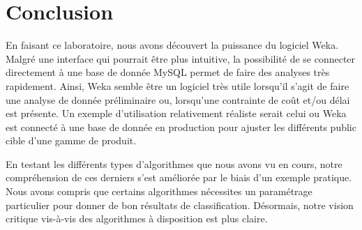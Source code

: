 \chapter{Conclusion}

En faisant ce laboratoire, nous avons découvert la puissance du logiciel Weka. Malgré une interface qui pourrait être plus intuitive, la possibilité de se connecter directement à une base de donnée MySQL permet de faire des analyses très rapidement. Ainsi, Weka semble être un logiciel très utile lorsqu'il s'agit de faire une analyse de donnée préliminaire ou, lorsqu'une contrainte de coût et/ou délai est présente. Un exemple d'utilisation relativement réaliste serait celui ou Weka est connecté à une base de donnée en production pour ajuster les différents public cible d'une gamme de produit.

En testant les différents types d'algorithmes que nous avons vu en cours, notre compréhension de ces derniers s'est améliorée par le biais d'un exemple pratique. Nous avons compris que certains algorithmes nécessites un paramétrage particulier pour donner de bon résultats de classification. Désormais, notre vision critique vis-à-vis des algorithmes à disposition est plus claire.
